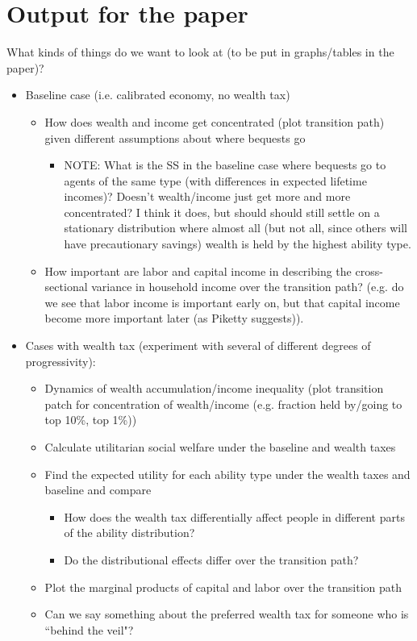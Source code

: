 \documentclass[article,11pt,letterpaper,fleqn]{article}
\theoremstyle{definition}
\numberwithin{equation}{section}
\begin{document}
\section{Output for the paper}

What kinds of things do we want to look at (to be put in graphs/tables in the paper)?

\begin{itemize}
\item Baseline case (i.e. calibrated economy, no wealth tax)
	\begin{itemize}
	\item How does wealth and income get concentrated (plot transition path) given different assumptions about where bequests go
		\begin{itemize}
		\item NOTE: What is the SS in the baseline case where bequests go to agents of the same type (with differences in expected lifetime incomes)?  Doesn't wealth/income just get more and more concentrated?  I think it does, but should should still settle on a stationary distribution where almost all (but not all, since others will have precautionary savings) wealth is held by the highest ability type.
		\end{itemize}
	\item How important are labor and capital income in describing the cross-sectional variance in household income over the transition path? (e.g. do we see that labor income is important early on, but that capital income become more important later (as Piketty suggests)).
	\end{itemize}
\item Cases with wealth tax (experiment with several of different degrees of progressivity):
	\begin{itemize}
	\item Dynamics of wealth accumulation/income inequality (plot transition patch for concentration of wealth/income (e.g. fraction held by/going to top 10\%, top 1\%))
	\item Calculate utilitarian social welfare under the baseline and wealth taxes
	\item Find the expected utility for each ability type under the wealth taxes and baseline and compare
		\begin{itemize}
		\item How does the wealth tax differentially affect people in different parts of the ability distribution?
		\item Do the distributional effects differ over the transition path?
		\end{itemize}
	\item Plot the marginal products of capital and labor over the transition path
	\item Can we say something about the preferred wealth tax for someone who is ``behind the veil"?
	\end{itemize}
\end{itemize}
\end{document}
